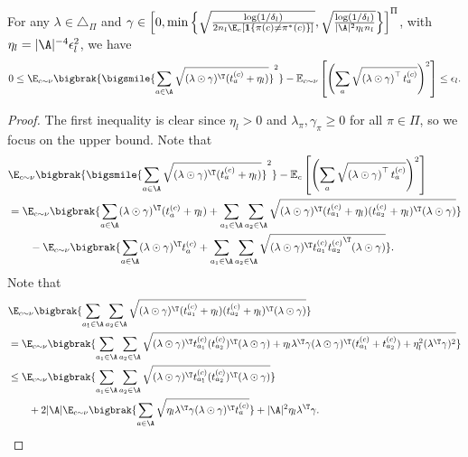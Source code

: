 \documentclass{article}
\newcommand{\1}{\mathbf{1}}
\begin{document}
\begin{lemma}\label{lem:E_9}
For any $\lambda\in\triangle_\Pi$ and $\gamma\in\left[0,\min\left\{\sqrt{\frac{\log(1/\delta_l)}{2n_l\E_c[\1\{\pi(c)\ne\pi^*(c)\}]}},\sqrt{\frac{\log(1/\delta_l)}{|\A|^2\eta_l n_l}}\right\}\right]^{\Pi}$, with $\eta_l=|\A|^{-4}\epsilon_l^{2}$, we have 
\[0\leq\E_{c\sim\nu}\bigbrak{\bigsmile{\sum_{a\in\A}\sqrt{(\lambda\odot \gamma)^\T (t_a^{(c)}+\eta_l)}}^2}-\mathbb{E}_{c\sim\nu}\left[\left(\sum_{a} \sqrt{\left(\lambda \odot \gamma\right)^{\top} t_a^{(c)}}\right)^{2}\right]\leq \epsilon_l.\]
\end{lemma}
\begin{proof} The first inequality is clear since $\eta_l>0$ and $\lambda_\pi,\gamma_\pi\geq 0$ for all $\pi\in\Pi$, so we focus on the upper bound.  Note that
\begin{align}
    &\E_{c\sim\nu}\bigbrak{\bigsmile{\sum_{a\in\A}\sqrt{(\lambda\odot \gamma)^\T (t_a^{(c)}+\eta_l)}}^2}-\mathbb{E}_{c}\left[\left(\sum_{a} \sqrt{\left(\lambda \odot \gamma\right)^{\top} t_a^{(c)}}\right)^{2}\right]\nonumber\\
    &= \E_{c\sim\nu}\bigbrak{\sum_{a\in\A}(\lambda\odot\gamma)^\T(t_a^{(c)}+\eta_l)+\sum_{a_1\in\A}\sum_{a_2\in\A}\sqrt{(\lambda\odot\gamma)^\T(t_{a_1}^{(c)}+\eta_l)(t_{a_2}^{(c)}+\eta_l)^\T(\lambda\odot\gamma)}}\nonumber\\
    &\qquad-\E_{c\sim\nu}\bigbrak{\sum_{a\in\A}(\lambda\odot\gamma)^\T t_a^{(c)}+\sum_{a_1\in\A}\sum_{a_2\in\A}\sqrt{(\lambda\odot\gamma)^\T t_{a_1}^{(c)}{t_{a_2}^{(c)}}^\T(\lambda\odot\gamma)}}.\label{eqn:20}
\end{align}
Note that 
\begin{align*}
    &\E_{c\sim\nu}\bigbrak{\sum_{a_1\in\A}\sum_{a_2\in\A}\sqrt{(\lambda\odot\gamma)^\T(t_{a_1}^{(c)}+\eta_l)(t_{a_2}^{(c)}+\eta_l)^\T(\lambda\odot\gamma)}}\\
    &= \E_{c\sim\nu}\bigbrak{\sum_{a_1\in\A}\sum_{a_2\in\A}\sqrt{(\lambda\odot\gamma)^\T t_{a_1}^{(c)}(t_{a_2}^{(c)})^\T(\lambda\odot\gamma)+\eta_l\lambda^\T\gamma(\lambda\odot\gamma)^\T (t_{a_1}^{(c)}+t_{a_2}^{(c)})+\eta_l^2(\lambda^\T\gamma)^2}}\\
    &\leq \E_{c\sim\nu}\bigbrak{\sum_{a_1\in\A}\sum_{a_2\in\A}\sqrt{(\lambda\odot\gamma)^\T t_{a_1}^{(c)}(t_{a_2}^{(c)})^\T(\lambda\odot\gamma)}}\\
    &\qquad+2|\A|\E_{c\sim\nu}\bigbrak{\sum_{a\in\A}\sqrt{\eta_l\lambda^\T\gamma(\lambda\odot\gamma)^\T t_{a}^{(c)}}}+|\A|^2\eta_l\lambda^\T\gamma.
\end{align*}

\end{proof}
\end{document}
